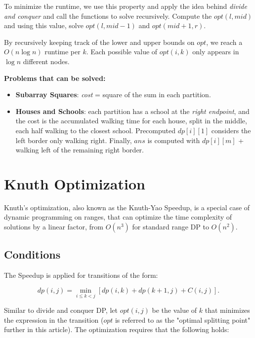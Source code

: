         To minimize the runtime, we use this property and apply the idea behind \textit{divide and conquer} 
        and call the functions to solve recursively. Compute the $opt(l, mid)$ and using this value, 
        solve $opt(l, mid-1)$ and $opt(mid+1, r)$.
        
        By recursively keeping track of the lower and upper bounds on $opt$, 
        we reach a $O(n \log n)$ runtime per $k$. Each possible value of $opt(i, k)$ only appears in $\log n$ different nodes.

        \textbf{Problems that can be solved:}

        \begin{itemize}
        \item \textbf{Subarray Squares}: \textit{cost} = square of the sum in each partition.
        \item \textbf{Houses and Schools}: each partition has a school at the \textit{right endpoint}, 
        and the cost is the accumulated walking time for each house, split in the middle, each half walking to the closest school.
        Precomputed $dp[i][1]$ considers the left border only walking right. Finally, $ans$ is computed with $dp[i][m]$ + walking left of the remaining right border.
        \end{itemize}


\section{Knuth Optimization}

    Knuth's optimization, also known as the Knuth-Yao Speedup, is a special case of dynamic programming on ranges, 
    that can optimize the time complexity of solutions by a linear factor, from $O(n^3)$ for standard range DP to $O(n^2)$.

    \subsection{Conditions}

        The Speedup is applied for transitions of the form:

        $$dp(i, j) = \min_{i \leq k < j} [ dp(i, k) + dp(k+1, j) + C(i, j) ].$$

        Similar to divide and conquer DP, let $opt(i, j)$ be the value of $k$ that minimizes the expression in the transition 
        ($opt$ is referred to as the "optimal splitting point" further in this article). The optimization requires that the following holds:

